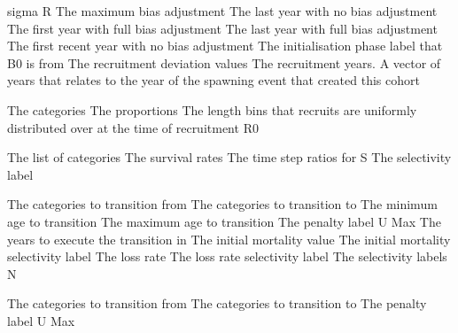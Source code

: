 {sigma R}
 {The maximum bias adjustment}
 {The last year with no bias adjustment}
 {The first year with full bias adjustment}
 {The last year with full bias adjustment}
 {The first recent year with no bias adjustment}
 {The initialisation phase label that B0 is from}
 {The recruitment deviation values}
 {The recruitment years. A vector of years that relates to the year of the spawning event that created this cohort}
\par\textbf{}\par
{} {The categories}
 {The proportions}
 {The length bins that recruits are uniformly distributed over at the time of recruitment}
 {R0}
\par\textbf{}\par
{} {The list of categories}
 {The survival rates}
 {The time step ratios for S}
 {The selectivity label}
\par\textbf{}\par
{} {The categories to transition from}
 {The categories to transition to}
 {The minimum age to transition}
 {The maximum age to transition}
 {The penalty label}
 {U Max}
 {The years to execute the transition in}
 {The initial mortality value}
 {The initial mortality selectivity label}
 {The loss rate}
 {The loss rate selectivity label}
 {The selectivity labels}
 {N}
\par\textbf{}\par
{} {The categories to transition from}
 {The categories to transition to}
 {The penalty label}
 {U Max}
 {}
 {}
 {}
 {}
\par\textbf{}\par

